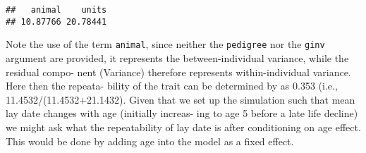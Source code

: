 \documentclass[12pt,]{book}
\newenvironment{Shaded}{\begin{snugshade}}{\end{snugshade}}
\newcommand{\DataTypeTok}[1]{\textcolor[rgb]{0.13,0.29,0.53}{#1}}
\newcommand{\DecValTok}[1]{\textcolor[rgb]{0.00,0.00,0.81}{#1}}
\newcommand{\FloatTok}[1]{\textcolor[rgb]{0.00,0.00,0.81}{#1}}
\newcommand{\KeywordTok}[1]{\textcolor[rgb]{0.13,0.29,0.53}{\textbf{#1}}}
\newcommand{\NormalTok}[1]{#1}
\newcommand{\OperatorTok}[1]{\textcolor[rgb]{0.81,0.36,0.00}{\textbf{#1}}}
\newcommand{\OtherTok}[1]{\textcolor[rgb]{0.56,0.35,0.01}{#1}}
\newcommand{\StringTok}[1]{\textcolor[rgb]{0.31,0.60,0.02}{#1}}
\begin{document}
\begin{Shaded}
\end{Shaded}

\begin{verbatim}
##   animal    units 
## 10.87766 20.78441
\end{verbatim}

Note the use of the term \texttt{animal}, since neither the \texttt{pedigree} nor the \texttt{ginv} argument are provided, it represents the between-individual variance, while the residual compo- nent (Variance) therefore represents within-individual variance. Here then the repeata- bility of the trait can be determined by as 0.353 (i.e., 11.4532/(11.4532+21.1432). Given that we set up the simulation such that mean lay date changes with age (initially increas- ing to age 5 before a late life decline) we might ask what the repeatability of lay date is after conditioning on age effect. This would be done by adding age into the model as a fixed effect.

\begin{Shaded}
\end{Shaded}
\end{document}
